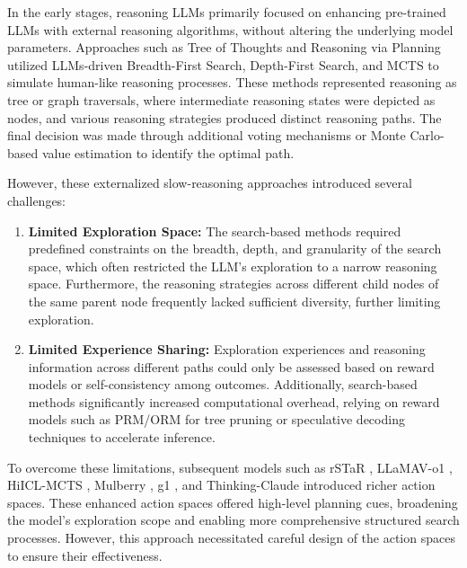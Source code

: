 In the early stages, reasoning LLMs primarily focused on enhancing pre-trained LLMs with external reasoning algorithms, without altering the underlying model parameters. Approaches such as Tree of Thoughts \cite{Tree_of_Thought} and Reasoning via Planning \cite{hao2023reasoning} utilized LLMs-driven Breadth-First Search, Depth-First Search, and MCTS \cite{Renda_Report_Tree_Search, browne2012survey, DBLP:journals/corr/abs-2410-16033, DBLP:journals/corr/abs-2412-09078} to simulate human-like reasoning processes. 
These methods represented reasoning as tree or graph traversals, where intermediate reasoning states were depicted as nodes, and various reasoning strategies produced distinct reasoning paths. The final decision was made through additional voting mechanisms \cite{wangself} or Monte Carlo-based value estimation to identify the optimal path.


However, these externalized slow-reasoning approaches introduced several challenges:
\begin{enumerate}[itemindent=0em]

\item \textbf{Limited Exploration Space:} The search-based methods required predefined constraints on the breadth, depth, and granularity of the search space, which often restricted the LLM's exploration to a narrow reasoning space. Furthermore, the reasoning strategies across different child nodes of the same parent node frequently lacked sufficient diversity, further limiting exploration.

\item \textbf{Limited Experience Sharing:} Exploration experiences and reasoning information across different paths could only be assessed based on reward models or self-consistency among outcomes. Additionally, search-based methods significantly increased computational overhead, relying on reward models such as PRM/ORM for tree pruning or speculative decoding techniques to accelerate inference.

\end{enumerate}
To overcome these limitations, subsequent models such as rSTaR \cite{rSTaR}, LLaMAV-o1 \cite{thawakar2025llamav}, HiICL-MCTS \cite{HiICL-MCTS}, Mulberry \cite{yao2024mulberry}, g1 \cite{g1}, and Thinking-Claude \cite{Thinking-Claude} introduced richer action spaces. 
These enhanced action spaces offered high-level planning cues, broadening the model's exploration scope and enabling more comprehensive structured search processes. 
However, this approach necessitated careful design of the action spaces to ensure their effectiveness.




